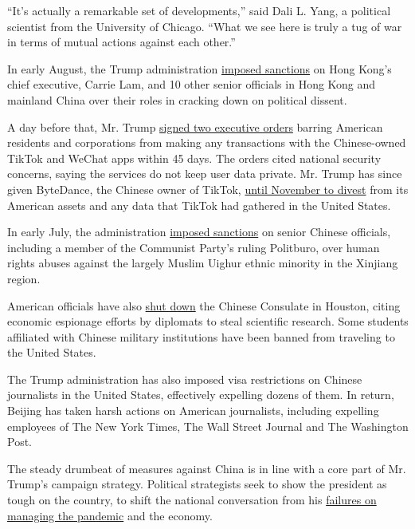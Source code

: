 ``It's actually a remarkable set of developments,'' said Dali L. Yang, a
political scientist from the University of Chicago. ``What we see here
is truly a tug of war in terms of mutual actions against each other.''

In early August, the Trump administration
\href{https://www.nytimes3xbfgragh.onion/2020/08/07/world/asia/trump-china-hong-kong-sanctions.html}{imposed
sanctions} on Hong Kong's chief executive, Carrie Lam, and 10 other
senior officials in Hong Kong and mainland China over their roles in
cracking down on political dissent.

A day before that, Mr. Trump
\href{https://www.nytimes3xbfgragh.onion/2020/08/06/technology/trump-wechat-tiktok-china.html}{signed
two executive orders} barring American residents and corporations from
making any transactions with the Chinese-owned TikTok and WeChat apps
within 45 days. The orders cited national security concerns, saying the
services do not keep user data private. Mr. Trump has since given
ByteDance, the Chinese owner of TikTok,
\href{https://www.nytimes3xbfgragh.onion/2020/08/14/business/tiktok-trump-bytedance-order.html}{until
November to divest} from its American assets and any data that TikTok
had gathered in the United States.

In early July, the administration
\href{https://www.nytimes3xbfgragh.onion/2020/07/09/world/asia/trump-china-sanctions-uighurs.html}{imposed
sanctions} on senior Chinese officials, including a member of the
Communist Party's ruling Politburo, over human rights abuses against the
largely Muslim Uighur ethnic minority in the Xinjiang region.

American officials have also
\href{https://www.nytimes3xbfgragh.onion/2020/07/22/world/asia/us-china-houston-consulate.html}{shut
down} the Chinese Consulate in Houston, citing economic espionage
efforts by diplomats to steal scientific research. Some students
affiliated with Chinese military institutions have been banned from
traveling to the United States.

The Trump administration has also imposed visa restrictions on Chinese
journalists in the United States, effectively expelling dozens of them.
In return, Beijing has taken harsh actions on American journalists,
including expelling employees of The New York Times, The Wall Street
Journal and The Washington Post.

The steady drumbeat of measures against China is in line with a core
part of Mr. Trump's campaign strategy. Political strategists seek to
show the president as tough on the country, to shift the national
conversation from his
\href{https://www.nytimes3xbfgragh.onion/2020/08/06/us/coronavirus-us.html}{failures
on managing the pandemic} and the economy.

